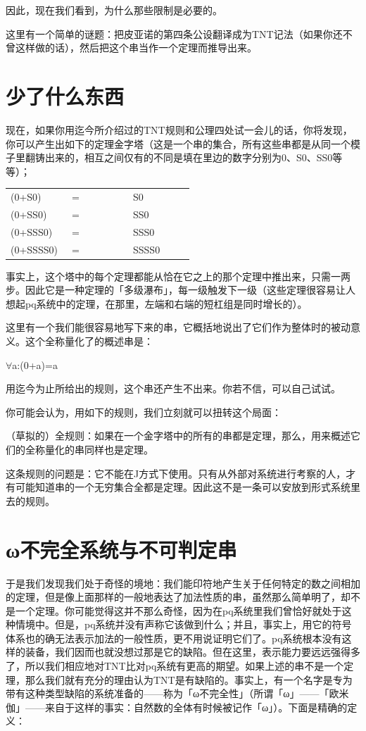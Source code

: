 \documentclass[
  12pt,
  twoside,
  openright,
  oldfontcommands,
]{memoir}
\begin{document}
因此，现在我们看到，为什么那些限制是必要的。

这里有一个简单的谜题：把皮亚诺的第四条公设翻译成为TNT记法（如果你还不曾这样做的话），然后把这个串当作一个定理而推导出来。

\section{少了什么东西}

现在，如果你用迄今所介绍过的TNT规则和公理四处试一会儿的话，你将发现，你可以产生出如下的定理金字塔（这是一个串的集合，所有这些串都是从同一个模子里翻铸出来的，相互之间仅有的不同是填在里边的数字分别为0、S0、SS0等等）；

\begin{longtable}[]{>{\raggedright\arraybackslash}p{0.313\linewidth} >{\raggedright\arraybackslash}p{0.313\linewidth} >{\raggedright\arraybackslash}p{0.313\linewidth}}
\toprule\noalign{}
\endhead
\bottomrule\noalign{}
\endlastfoot
(0+S0) & = & S0 \\
(0+SS0) & = & SS0 \\
(0+SSS0) & = & SSS0 \\
(0+SSSS0) & = & SSSS0 \\
\end{longtable}

事实上，这个塔中的每个定理都能从恰在它之上的那个定理中推出来，只需一两步。因此它是一种定理的「多级瀑布」，每一级触发下一级（这些定理很容易让人想起pq系统中的定理，在那里，左端和右端的短杠组是同时增长的）。

这里有一个我们能很容易地写下来的串，它概括地说出了它们作为整体时的被动意义。这个全称量化了的概述串是：

$\forall$a:(0+a)=a

用迄今为止所给出的规则，这个串还产生不出来。你若不信，可以自己试试。

你可能会认为，用如下的规则，我们立刻就可以扭转这个局面：

（草拟的）全规则：如果在一个金字塔中的所有的串都是定理，那么，用来概述它们的全称量化的串同样也是定理。

这条规则的问题是：它不能在J方式下使用。只有从外部对系统进行考察的人，才有可能知道串的一个无穷集合全都是定理。因此这不是一条可以安放到形式系统里去的规则。

\section{ω不完全系统与不可判定串}

于是我们发现我们处于奇怪的境地：我们能印符地产生关于任何特定的数之间相加的定理，但是像上面那样的一般地表达了加法性质的串，虽然那么简单明了，却不是一个定理。你可能觉得这并不那么奇怪，因为在pq系统里我们曾恰好就处于这种情境中。但是，pq系统并没有声称它该做到什么；并且，事实上，用它的符号体系也的确无法表示加法的一般性质，更不用说证明它们了。pq系统根本没有这样的装备，我们因而也就没想过那是它的缺陷。但在这里，表示能力要远远强得多了，所以我们相应地对TNT比对pq系统有更高的期望。如果上述的串不是一个定理，那么我们就有充分的理由认为TNT是有缺陷的。事实上，有一个名字是专为带有这种类型缺陷的系统准备的------称为「ω不完全性」（所谓「ω」------「欧米伽」------来自于这样的事实：自然数的全体有时候被记作「ω」）。下面是精确的定义：
\end{document}
